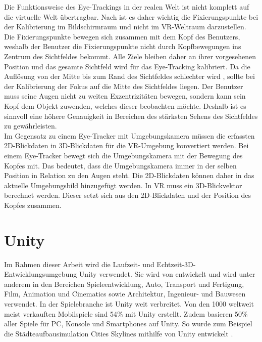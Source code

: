 Die Funktionsweise des Eye-Trackings in der realen Welt ist nicht komplett auf die virtuelle Welt übertragbar. Nach \citeauthor{Clay_Koenig_Koenig_2019} ist es daher wichtig die Fixierungspunkte bei der Kalibrierung im Bildschirmraum und nicht im \ac{VR}-Weltraum darzustellen. Die Fixierungspunkte bewegen sich zusammen mit dem Kopf des Benutzers, weshalb der Benutzer die Fixierungspunkte nicht durch Kopfbewegungen ins Zentrum des Sichtfeldes bekommt. Alle Ziele bleiben daher an ihrer vorgesehenen Position und das gesamte Sichtfeld wird für das Eye-Tracking kalibriert. \cite{Clay_Koenig_Koenig_2019} Da die Auflösung von der Mitte bis zum Rand des Sichtfeldes schlechter wird \cite{Kreylos.2017}, sollte bei der Kalibrierung der Fokus auf die Mitte des Sichtfeldes liegen. Der Benutzer muss seine Augen nicht zu weiten Exzentrizitäten bewegen, sondern kann sein Kopf dem Objekt zuwenden, welches dieser beobachten möchte. Deshalb ist es sinnvoll eine höhere Genauigkeit in Bereichen des stärksten Sehens des Sichtfeldes zu gewährleisten. \cite{Clay_Koenig_Koenig_2019} \\ 
Im Gegensatz zu einem Eye-Tracker mit Umgebungskamera müssen die erfassten 2D-Blickdaten in 3D-Blickdaten für die \ac{VR}-Umgebung konvertiert werden. Bei einem Eye-Tracker bewegt sich die Umgebungskamera mit der Bewegung des Kopfes mit. Das bedeutet, dass die Umgebungskamera immer in der selben Position in Relation zu den Augen steht. Die 2D-Blickdaten können daher in das aktuelle Umgebungsbild hinzugefügt werden. In \ac{VR} muss ein 3D-Blickvektor berechnet werden. Dieser setzt sich aus den 2D-Blickdaten und der Position des Kopfes zusammen. \cite{Clay_Koenig_Koenig_2019}

\section{Unity}
Im Rahmen dieser Arbeit wird die Laufzeit- \cite{Schwichtenberg.2020} und Echtzeit-3D-Entwicklungsumgebung \cite{Unity.2020} Unity verwendet. Sie wird von \citeauthor{Unity-Facts.2020} entwickelt und wird unter anderem in den Bereichen Spieleentwicklung, Auto, Transport und Fertigung, Film, Animation und Cinematics sowie Architektur, Ingenieur- und Bauwesen verwendet. \cite{Unity.2020} In der Spielebranche ist Unity weit verbreitet. Von den 1000 weltweit meist verkauften Mobilspiele sind 54\% mit Unity erstellt. Zudem basieren 50\% aller Spiele für PC, Konsole und Smartphones auf Unity. \cite{Unity-Facts.2020} So wurde zum Beispiel die Städteaufbausimulation Cities Skylines mithilfe von Unity entwickelt \cite{Cities.2020}.

